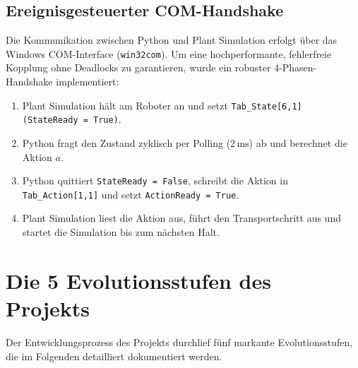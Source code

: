 \documentclass[11pt,a4paper]{article}
\begin{document}
\subsection{Ereignisgesteuerter COM-Handshake}
Die Kommunikation zwischen Python und Plant Simulation erfolgt über das Windows COM-Interface (\texttt{win32com}). Um eine hochperformante, fehlerfreie Kopplung ohne Deadlocks zu garantieren, wurde ein robuster 4-Phasen-Handshake implementiert:
\begin{enumerate}
  \item Plant Simulation hält am Roboter an und setzt \texttt{Tab\_State[6,1] (StateReady = True)}.
  \item Python fragt den Zustand zyklisch per Polling ($2\,\text{ms}$) ab und berechnet die Aktion $a$.
  \item Python quittiert \texttt{StateReady = False}, schreibt die Aktion in \texttt{Tab\_Action[1,1]} und setzt \texttt{ActionReady = True}.
  \item Plant Simulation liest die Aktion aus, führt den Transportschritt aus und startet die Simulation bis zum nächsten Halt.
\end{enumerate}

\section{Die 5 Evolutionsstufen des Projekts}

Der Entwicklungsprozess des Projekts durchlief fünf markante Evolutionsstufen, die im Folgenden detailliert dokumentiert werden.
\end{document}
